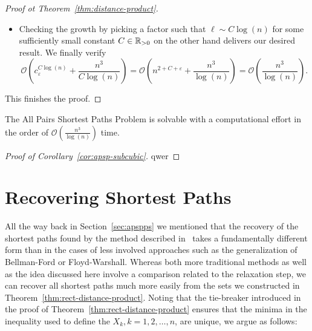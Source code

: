 \begin{proof}[Proof ot Theorem~\ref{thm:distance-product}]
\begin{itemize}
            We compute that $c_\varepsilon^n n^{2 + \varepsilon}$ grows exponentially, and will thus dominate the polynomial behaviour of $n^2$ in the long run.
            Therefore, the naive choice results in a runtime worse than Floyd-Warshall.
            Even less trivial variants like $\ell \sim n^{1 - \varepsilon}$ retain the exponential growth: $c_\varepsilon^{n^{1 - \varepsilon}}$, and are thus unsuited.
        \item %
            Checking the growth by picking a factor such that $\ell \sim C \log(n)$ for some sufficiently small constant $C \in \mathbb{R}_{> 0}$ on the other hand delivers our desired result.
            We finally verify
            \[
                \mathcal{O}\left( c_\varepsilon^{C \log(n)} + \frac{n^3}{C \log(n)} \right) = \mathcal{O}\left( n^{2 + C + \varepsilon} + \frac{n^3}{\log(n)} \right) = \mathcal{O}\left( \frac{n^3}{\log(n)} \right).
            \]
    \end{itemize}
    This finishes the proof.
\end{proof}

\begin{corollary}\label{cor:apsp-subcubic}
    The All Pairs Shortest Paths Problem is solvable with a computational effort in the order of $\mathcal{O}\left( \frac{n^3}{\log(n)} \right)$ time.
\end{corollary}

\begin{proof}[Proof of Corollary~\ref{cor:apsp-subcubic}]
    qwer
\end{proof}

\section{Recovering Shortest Paths}\label{sec:recovery}

All the way back in Section~\ref{sec:apspps} we mentioned that the recovery of the shortest paths found by the method described in~\cite{Chan2007} takes a fundamentally different form than in the cases of less involved approaches such as the generalization of Bellman-Ford or Floyd-Warshall.
Whereas both more traditional methods as well as the idea discussed here involve a comparison related to the relaxation step, we can recover all shortest paths much more easily from the sets we constructed in Theorem~\ref{thm:rect-distance-product}.
Noting that the tie-breaker introduced in the proof of Theorem~\ref{thm:rect-distance-product} ensures that the minima in the inequality used to define the $X_k, k = 1, 2, \dots, n$, are unique, we argue as follows:

